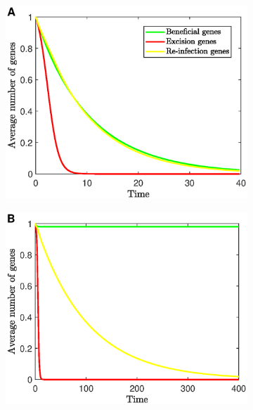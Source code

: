  \begin{figure}[H]
    \centering
     \begin{subfigure}[t]{0.50\textwidth} 
    \includegraphics[scale=0.50]{triv}
     \end{subfigure}\hfill
         \begin{subfigure}[t]{0.50\textwidth}
    \includegraphics[scale=0.50]{E_b}
    \end{subfigure}\hfill\\  \begin{subfigure}[t]{0.50\textwidth}

\end{subfigure}
\end{figure}
